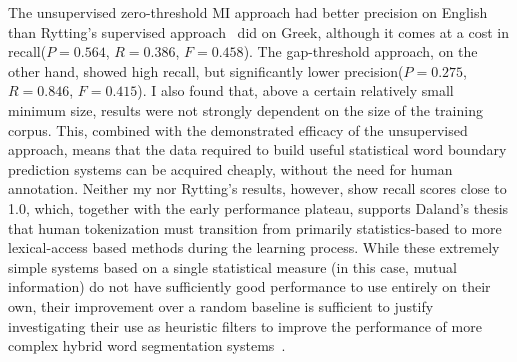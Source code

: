 The unsupervised zero-threshold MI approach had better precision on English than Rytting's supervised approach~\cite{rytting04} did on Greek, although it comes at a cost in recall\textemdash($P = 0.564$, $R = 0.386$, $F = 0.458$). The gap-threshold approach, on the other hand, showed high recall, but significantly lower precision\textemdash($P = 0.275$, $R = 0.846$, $F = 0.415$). I also found that, above a certain relatively small minimum size, results were not strongly dependent on the size of the training corpus. This, combined with the demonstrated efficacy of the unsupervised approach, means that the data required to build useful statistical word boundary prediction systems can be acquired cheaply, without the need for human annotation. Neither my nor Rytting's results, however, show recall scores close to 1.0, which, together with the early performance plateau, supports Daland's thesis that human tokenization must transition from primarily statistics-based to more lexical-access based methods during the learning process. While these extremely simple systems based on a single statistical measure (in this case, mutual information) do not have sufficiently good performance to use entirely on their own, their improvement over a random baseline is sufficient to justify investigating their use as heuristic filters to improve the performance of more complex hybrid word segmentation systems~\cite{kearsley14}.

